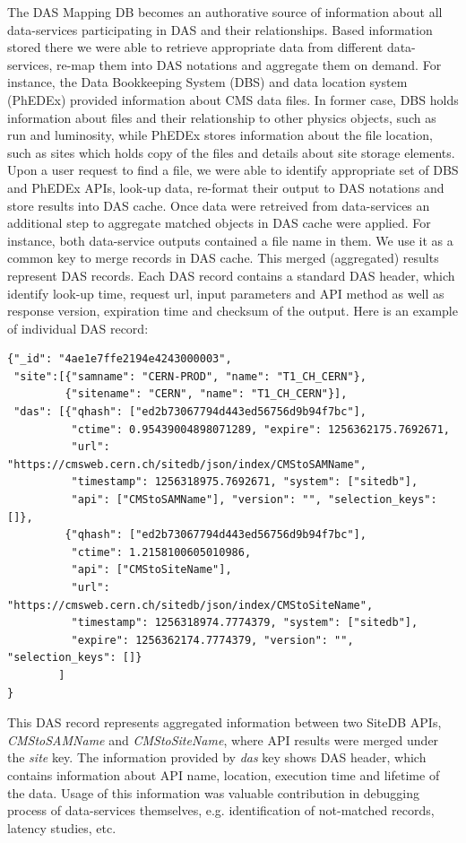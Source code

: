 \documentclass[a4paper]{jpconf}
\begin{document}
The DAS Mapping DB becomes an authorative
source of information about all data-services participating in DAS and their
relationships. Based information stored there we were able to retrieve appropriate data
from different data-services, re-map them into DAS notations and
aggregate them on demand.
For instance, the Data Bookkeeping System (DBS) and data location system (PhEDEx)
provided information about CMS data files. In former case, DBS holds information about
files and their relationship to other physics objects, such as run and luminosity, 
while PhEDEx stores information about the file location, such as sites which
holds copy of the files and details about site storage elements.
Upon a user request to find a file, we were able to identify appropriate set of
DBS and PhEDEx APIs, look-up data, re-format their output to DAS notations and
store results into DAS cache.
Once data were retreived from data-services an additional step to aggregate
matched objects in DAS cache were applied. For instance, both data-service outputs 
contained a file name in them. We use it as a common key to merge records in DAS cache.
This merged (aggregated) results represent DAS records. Each DAS
record contains a standard DAS header, which identify look-up time,
request url, input parameters and API method as well as response version, expiration
time and checksum of the output. Here is an example of individual DAS record:
\begin{verbatim}
{"_id": "4ae1e7ffe2194e4243000003", 
 "site":[{"samname": "CERN-PROD", "name": "T1_CH_CERN"}, 
         {"sitename": "CERN", "name": "T1_CH_CERN"}], 
 "das": [{"qhash": ["ed2b73067794d443ed56756d9b94f7bc"], 
          "ctime": 0.95439004898071289, "expire": 1256362175.7692671, 
          "url": "https://cmsweb.cern.ch/sitedb/json/index/CMStoSAMName", 
          "timestamp": 1256318975.7692671, "system": ["sitedb"], 
          "api": ["CMStoSAMName"], "version": "", "selection_keys": []}, 
         {"qhash": ["ed2b73067794d443ed56756d9b94f7bc"], 
          "ctime": 1.2158100605010986, 
          "api": ["CMStoSiteName"], 
          "url": "https://cmsweb.cern.ch/sitedb/json/index/CMStoSiteName", 
          "timestamp": 1256318974.7774379, "system": ["sitedb"], 
          "expire": 1256362174.7774379, "version": "", "selection_keys": []}
        ]
}
\end{verbatim}
This DAS record represents aggregated information between two SiteDB APIs, 
{\it CMStoSAMName} and {\it CMStoSiteName}, where API results were merged 
under the {\it site} key. The information provided by {\it das} key shows 
DAS header, which contains information about API name, location, execution 
time and lifetime of the data.
Usage of this information was valuable contribution in debugging process of
data-services themselves, e.g. identification of not-matched records, 
latency studies, etc.
\end{document}
